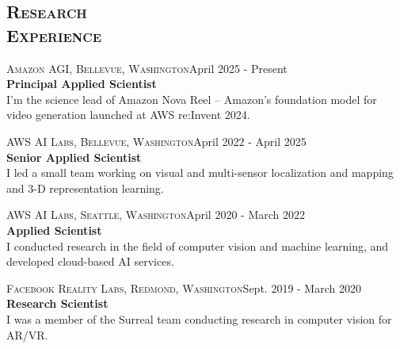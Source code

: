 \documentclass[margin, line, 10pt]{res} %
\begin{document}
\begin{resume}
\section{\textsc{Research\\Experience}}

\textsc{Amazon AGI, Bellevue, Washington}\hfill April 2025 - Present \\
\textbf{Principal Applied Scientist}\\ 
I'm the science lead of Amazon Nova Reel -- Amazon's foundation model for video generation launched at AWS re:Invent 2024.

\textsc{AWS AI Labs, Bellevue, Washington}\hfill April 2022 - April 2025 \\
\textbf{Senior Applied Scientist}\\ 
I led a small team working on visual and multi-sensor localization and mapping and 3-D representation learning. %

\textsc{AWS AI Labs, Seattle, Washington}\hfill April 2020 - March 2022 \\
\textbf{Applied Scientist}\\ 
I conducted research in the field of computer vision and machine learning, and developed cloud-based AI services. %

\textsc{Facebook Reality Labs, Redmond, Washington}\hfill Sept. 2019 - March 2020 \\
\textbf{Research Scientist}\\
I was a member of the Surreal team conducting research in computer vision for AR/VR.




\end{resume}
\end{document}
